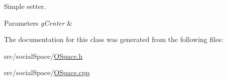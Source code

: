 Simple setter. 


\begin{DoxyParams}{Parameters}
{\em g\+Center} & \\
\hline
\end{DoxyParams}


The documentation for this class was generated from the following files\+:\begin{DoxyCompactItemize}
\item 
src/social\+Space/\hyperlink{OSpace_8h}{O\+Space.\+h}\item 
src/social\+Space/\hyperlink{OSpace_8cpp}{O\+Space.\+cpp}\end{DoxyCompactItemize}
